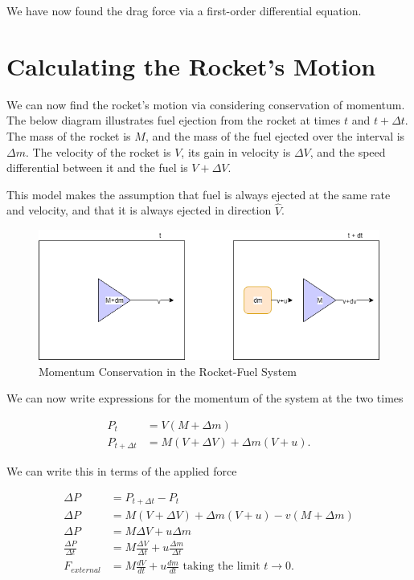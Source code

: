 \documentclass[]{article}
\begin{document}
We have now found the drag force via a first-order differential equation.

\section{Calculating the Rocket's Motion}

We can now find the rocket's motion via considering conservation of momentum. The below diagram illustrates fuel ejection from the rocket at times $t$ and $t+\Delta t$. The mass of the rocket is $M$, and the mass of the fuel ejected over the interval is $\Delta m$. The velocity of the rocket is $V$, its gain in velocity is $\Delta V$, and the speed differential between it and the fuel is $V+\Delta V$.

This model makes the assumption that fuel is always ejected at the same rate and velocity, and that it is always ejected in direction $\hat{V}$.

\begin{figure}[h]
	\begin{center}
		\caption{Momentum Conservation in the Rocket-Fuel System}
		\label{momentum}
		\includegraphics[scale=0.6]{momentum.png}
	\end{center}
\end{figure}

We can now write expressions for the momentum of the system at the two times

\begin{center}
	\begin{align*}
	P_{t} &= V(M+\Delta m) \\
	P_{t+\Delta t} &= M(V + \Delta V) + \Delta m (V+u) .
	\end{align*}
\end{center}

We can write this in terms of the applied force

\begin{center}
	\begin{align*}
	\Delta P &= P_{t+\Delta t} - P_{t} \\
	\Delta P &= M(V + \Delta V) + \Delta m (V+u) - v(M+\Delta m) \\
	\Delta P &= M\Delta V + u\Delta m \\
	\frac{\Delta P}{\Delta t} &= M\frac{\Delta V}{\Delta t} +  u\frac{\Delta m}{\Delta t} \\
	F_{external} &= M \frac{dV}{dt} + u \frac{dm}{dt} \text{  taking the limit $t\rightarrow 0$} .
	\end{align*}
\end{center}
\end{document}
